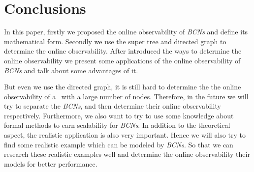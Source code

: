 \section{Conclusions}
\label{sec:con}
In this paper, firstly we proposed the online observability of {\em BCNs} and define its mathematical form. Secondly we use the super tree and directed graph to determine the online observability. After introduced the ways to determine the online observability we present some applications of the online observability of {\em BCNs} and talk about some advantages of it. 

But even we use the directed graph, it is still hard to determine the  the online observability of a \BCN\ with a large number of nodes. Therefore, in the future we will try to separate the {\em BCNs}, and then determine their online observability respectively. Furthermore, we also want to try to use some knowledge about formal methods to earn scalability for {\em BCNs}. In addition to the theoretical aspect, the realistic application is also very important. Hence we will also try to find some realistic example which can be modeled by {\em BCNs}. So that we can research these realistic examples well and determine the online observability their models for better performance.